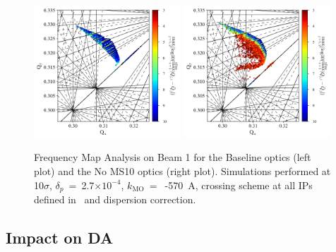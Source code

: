 \documentclass{cernatsnote}
\begin{document}
\begin{figure}[h!]
\centering
\includegraphics[width=0.49\textwidth]{images/fma_baseb1.png} \hfill \includegraphics[width=0.49\textwidth]{images/fma_noms10b1.png} \\
\caption{\label{fma_ms10} Frequency Map Analysis on Beam 1 for the Baseline optics (left plot) and the No MS10 optics (right plot). Simulations performed at 10$\sigma$, $\delta_{p}$~=~2.7$\times 10^{-4}$,  $k_{\mathrm{MO}}~=$~-570~A, crossing scheme at all IPs defined in~\cite{hllhc_param1,hllhc_param2} and dispersion correction.}
\end{figure}

\subsection{Impact on DA}
\end{document}
